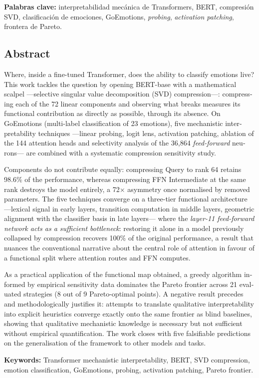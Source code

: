 \documentclass[11pt, a4paper]{article}
\begin{document}
\textbf{Palabras clave:} interpretabilidad mecánica de Transformers, BERT,
compresión SVD, clasificación de emociones, GoEmotions, \emph{probing},
\emph{activation patching}, frontera de Pareto.

\vspace{1cm}

\begin{otherlanguage}{english}
\section*{Abstract}
\noindent
Where, inside a fine-tuned Transformer, does the ability to classify
emotions live? This work tackles the question by opening BERT-base with a
mathematical scalpel ---selective singular value decomposition (SVD)
compression---: compressing each of the 72 linear components and observing
what breaks measures its functional contribution as directly as possible,
through its absence. On GoEmotions (multi-label classification of 23
emotions), five mechanistic interpretability techniques ---linear probing,
logit lens, activation patching, ablation of the 144 attention heads and
selectivity analysis of the 36{,}864 \emph{feed-forward} neurons--- are
combined with a systematic compression sensitivity study.

Components do not contribute equally: compressing Query to rank 64
retains 98.6\% of the performance, whereas compressing FFN Intermediate
at the same rank destroys the model entirely, a 72$\times$ asymmetry once
normalised by removed parameters. The five techniques converge on a
three-tier functional architecture ---lexical signal in early layers,
transition computation in middle layers, geometric alignment with the
classifier basis in late layers--- where the \emph{layer-11 feed-forward
network acts as a sufficient bottleneck}: restoring it alone in a model
previously collapsed by compression recovers 100\% of the original
performance, a result that nuances the conventional narrative about the
central role of attention in favour of a functional split where attention
routes and FFN computes.

As a practical application of the functional map obtained, a greedy
algorithm informed by empirical sensitivity data dominates the Pareto
frontier across 21 evaluated strategies (8 out of 9 Pareto-optimal
points). A negative result precedes and methodologically justifies it:
attempts to translate qualitative interpretability into explicit
heuristics converge exactly onto the same frontier as blind baselines,
showing that qualitative mechanistic knowledge is necessary but not
sufficient without empirical quantification. The work closes with five
falsifiable predictions on the generalisation of the framework to other
models and tasks.

\textbf{Keywords:} Transformer mechanistic interpretability, BERT, SVD
compression, emotion classification, GoEmotions, probing, activation
patching, Pareto frontier.
\end{otherlanguage}
\end{document}
